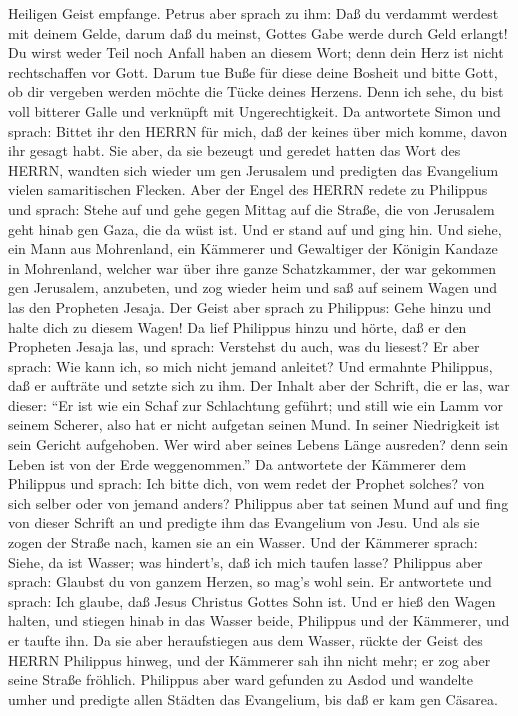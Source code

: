 Heiligen Geist empfange.  Petrus aber sprach zu ihm: Daß du
verdammt werdest mit deinem Gelde, darum daß du meinst, Gottes Gabe
werde durch Geld erlangt!  Du wirst weder Teil noch Anfall
haben an diesem Wort; denn dein Herz ist nicht rechtschaffen vor Gott.
 Darum tue Buße für diese deine Bosheit und bitte Gott, ob
dir vergeben werden möchte die Tücke deines Herzens.  Denn
ich sehe, du bist voll bitterer Galle und verknüpft mit Ungerechtigkeit.
 Da antwortete Simon und sprach: Bittet ihr den HERRN für
mich, daß der keines über mich komme, davon ihr gesagt habt.
 Sie aber, da sie bezeugt und geredet hatten das Wort des
HERRN, wandten sich wieder um gen Jerusalem und predigten das Evangelium
vielen samaritischen Flecken.  Aber der Engel des HERRN
redete zu Philippus und sprach: Stehe auf und gehe gegen Mittag auf die
Straße, die von Jerusalem geht hinab gen Gaza, die da wüst ist.
 Und er stand auf und ging hin. Und siehe, ein Mann aus
Mohrenland, ein Kämmerer und Gewaltiger der Königin Kandaze in
Mohrenland, welcher war über ihre ganze Schatzkammer, der war gekommen
gen Jerusalem, anzubeten,  und zog wieder heim und saß auf
seinem Wagen und las den Propheten Jesaja.  Der Geist aber
sprach zu Philippus: Gehe hinzu und halte dich zu diesem Wagen!
 Da lief Philippus hinzu und hörte, daß er den Propheten
Jesaja las, und sprach: Verstehst du auch, was du liesest? 
Er aber sprach: Wie kann ich, so mich nicht jemand anleitet? Und
ermahnte Philippus, daß er aufträte und setzte sich zu ihm.
 Der Inhalt aber der Schrift, die er las, war dieser: ``Er
ist wie ein Schaf zur Schlachtung geführt; und still wie ein Lamm vor
seinem Scherer, also hat er nicht aufgetan seinen Mund.  In
seiner Niedrigkeit ist sein Gericht aufgehoben. Wer wird aber seines
Lebens Länge ausreden? denn sein Leben ist von der Erde weggenommen.''
 Da antwortete der Kämmerer dem Philippus und sprach: Ich
bitte dich, von wem redet der Prophet solches? von sich selber oder von
jemand anders?  Philippus aber tat seinen Mund auf und fing
von dieser Schrift an und predigte ihm das Evangelium von Jesu.
 Und als sie zogen der Straße nach, kamen sie an ein
Wasser. Und der Kämmerer sprach: Siehe, da ist Wasser; was hindert's,
daß ich mich taufen lasse?  Philippus aber sprach: Glaubst
du von ganzem Herzen, so mag's wohl sein. Er antwortete und sprach: Ich
glaube, daß Jesus Christus Gottes Sohn ist.  Und er hieß
den Wagen halten, und stiegen hinab in das Wasser beide, Philippus und
der Kämmerer, und er taufte ihn.  Da sie aber heraufstiegen
aus dem Wasser, rückte der Geist des HERRN Philippus hinweg, und der
Kämmerer sah ihn nicht mehr; er zog aber seine Straße fröhlich.
 Philippus aber ward gefunden zu Asdod und wandelte umher
und predigte allen Städten das Evangelium, bis daß er kam gen Cäsarea.

